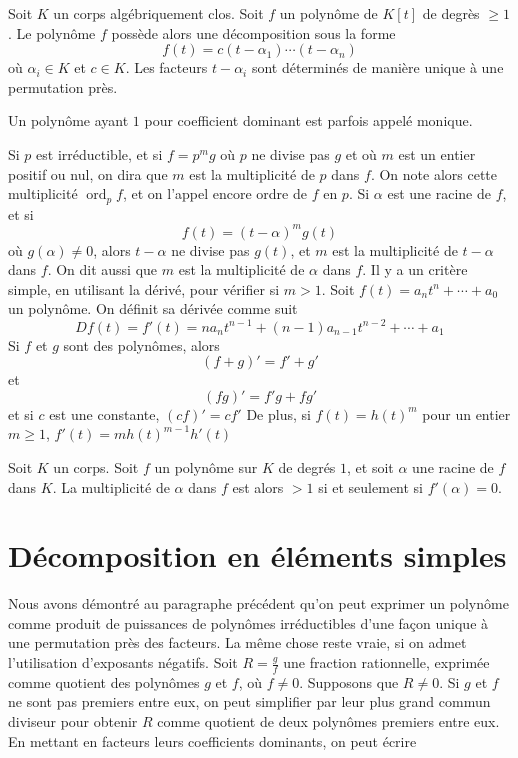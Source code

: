 \begin{corollaire}
    Soit $K$ un corps algébriquement clos. Soit $f$ un polynôme de $K[t]$ de degrès $\geq 1$. Le polynôme $f$ possède alors une décomposition sous la forme
    \[
    f(t)=c(t-\alpha_1)\cdots(t-\alpha_n)
    \]
    où $\alpha_i\in K$ et $c\in K$. Les facteurs $t-\alpha_i$ sont déterminés de manière unique à une permutation près.
\end{corollaire}

Un polynôme ayant $1$ pour coefficient dominant est parfois appelé monique.

    \begin{definition}
        Si $p$ est irréductible, et si $f=p^mg$ où $p$ ne divise pas $g$ et où $m$ est un entier positif ou nul, on dira que $m$ est la multiplicité de $p$ dans $f$. On note alors cette multiplicité $\operatorname{ord}_pf$, et on l'appel encore ordre de $f$ en $p$.
        Si $\alpha$ est une racine de $f$, et si
        \[
        f(t)=(t-\alpha)^mg(t)
        \]
        où $g(\alpha)\neq 0$, alors $t-\alpha$ ne divise pas $g(t)$, et $m$ est la multiplicité de $t-\alpha$ dans $f$.
        On dit aussi que $m$ est la multiplicité de $\alpha$ dans $f$. Il y a un critère simple, en utilisant la dérivé, pour vérifier si $m> 1$. Soit $f(t)=a_nt^n+\cdots+a_0$ un polynôme. On définit sa dérivée comme suit
        \[
        Df(t)=f'(t)=na_nt^{n-1}+(n-1)a_{n-1}t^{n-2}+\cdots+a_1
        \]
        Si $f$ et $g$ sont des polynômes, alors
        \[
        (f+g)'=f'+g'
        \]
        et
        \[
        (fg)'=f'g+fg'
        \]
        et si $c$ est une constante, $(cf)'=cf'$
        De plus, si $f(t)=h(t)^m$ pour un entier $m\geq 1$, $f'(t)=mh(t)^{m-1}h'(t)$
    \end{definition}


    \begin{theoreme}
        Soit $K$ un corps. Soit $f$ un polynôme sur $K$ de degrés $1$, et soit $\alpha$ une racine de $f$ dans $K$. La multiplicité de $\alpha$ dans $f$ est alors $>1$ si et seulement si $f'(\alpha)=0$.
    \end{theoreme}

\section{Décomposition en éléments simples}
Nous avons démontré au paragraphe précédent qu’on peut exprimer un polynôme comme produit de puissances de polynômes irréductibles d’une façon unique à une permutation près des facteurs. La même chose reste vraie, si on admet l’utilisation d’exposants négatifs. Soit \( R = \frac{g}{f} \) une fraction rationnelle, exprimée comme quotient des polynômes \( g \) et \( f \), où \( f \neq 0 \). Supposons que \( R \neq 0 \). Si \( g \) et \( f \) ne sont pas premiers entre eux, on peut simplifier par leur plus grand commun diviseur pour obtenir \( R \) comme quotient de deux polynômes premiers entre eux. En mettant en facteurs leurs coefficients dominants, on peut écrire  

